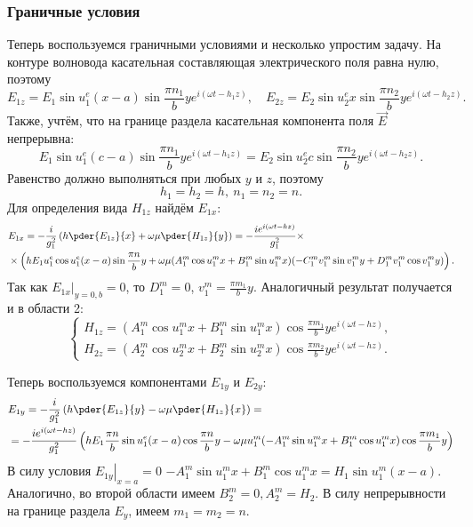 \subsubsection{Граничные условия}
Теперь воспользуемся граничными условиями и несколько упростим задачу.
На контуре волновода касательная составляющая электрического поля равна нулю,
поэтому
    \[
        E_{1z} = E_1\sin u^e_1 (x-a) \sin \frac{\pi n_1}{b}y
        e^{i(\omega t - h_1 z)},\quad
        E_{2z} = E_2\sin u^e_2 x \sin \frac{\pi n_2}{b}y
        e^{i(\omega t - h_2 z)}.
    \]
Также, учтём, что на границе раздела касательная компонента поля \( \vec{E} \)
непрерывна:
    \[
        E_1\sin u^e_1 (c-a) \sin \frac{\pi n_1}{b}y
        e^{i(\omega t - h_1 z)} =
        E_2\sin u^e_2 c \sin \frac{\pi n_2}{b}y
        e^{i(\omega t - h_2 z)}.
    \]
Равенство должно выполняться при любых \( y \) и \( z \), поэтому
\[
    \boxed{h_1 = h_2 = h,\ n_1 = n_2 = n.}
\]
Для определения вида \( H_{1z} \) найдём \( E_{1x} \):
\begin{align*}
    & E_{1x} =
    -\frac{i}{g_1^2}\left( h\pder{E_{1z}}{x} + \omega\mu\pder{H_{1z}}{y} \right)
    = -\frac{ie^{i(\omega t - h z)}}{g_1^2}\times\\
    &\times\left( h E_1 u^e_1 \cos u^e_1(x-a)\sin\frac{\pi n}{b}y +
    \omega\mu(A^m_1\cos u^m_1 x + B^m_1\sin u^m_1 x)
    (-C^m_1 v^m_1 \sin v^m_1 y + D^m_1 v^m_1 \cos v^m_1 y)\right).
\end{align*}
Так как \( \left.E_{1x}\right|_{y=0,b} = 0 \), то \( D^m_1 = 0 \),
\( v^m_1 = \frac{\pi m_1}{b} y \). Аналогичный результат получается и в области
2:
\[
    \left\{
    \begin{array}{l}
        H_{1z} =
        (A^m_1\cos u^m_1 x + B^m_1\sin u^m_1 x)\cos\frac{\pi m_1}{b}y
        e^{i(\omega t - h z)}, \\
        H_{2z} =
        (A^m_2\cos u^m_2 x + B^m_2\sin u^m_2 x)\cos\frac{\pi m_2}{b}y
        e^{i(\omega t - h z)}.
    \end{array}
    \right.
\]

Теперь воспользуемся компонентами \( E_{1y} \) и \( E_{2y} \):
\begin{align*}
    & E_{1y} = -\frac{i}{g_1^2}\left( h\pder{E_{1z}}{y} -
    \omega\mu\pder{H_{1z}}{x} \right) = \\
    & = -\frac{ie^{i(\omega t - hz)}}{g_1^2}\left( h E_1 \frac{\pi n}{b}
    \sin u^e_1(x-a)\cos\frac{\pi n}{b}y - \omega\mu
    u^m_1 (-A^m_1 \sin u^m_1 x + B^m_1\cos u^m_1 x)\cos\frac{\pi m_1}{b}y
   \right)
\end{align*}
В силу условия \( \left.E_{1y}\right|_{x=a} = 0 \)
\( -A^m_1 \sin u^m_1 x + B^m_1\cos u^m_1 x = H_1\sin u^m_1(x-a) \).
Аналогично, во второй области имеем \(B^m_2=0, A^m_2 = H_2\).
В силу непрерывности на границе раздела \( E_y \), имеем \( m_1 = m_2 = n \).


